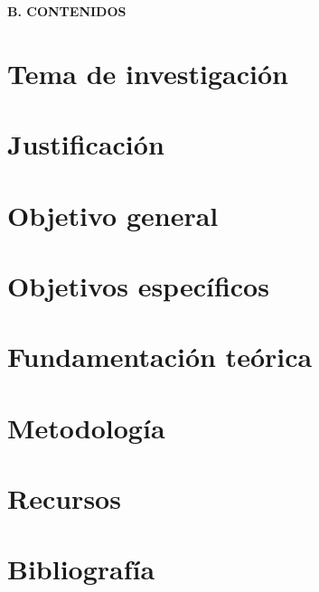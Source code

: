 \documentclass{perfil}
\begin{document}


\renewcommand{\thepage}{\arabic{page}}%
\begin{center} \textbf{B. CONTENIDOS} \end{center}

\section{Tema de investigación}


% 

\section{Justificación}


\section{Objetivo general}


\section{Objetivos específicos}


\section{Fundamentación teórica}




\section{Metodología}







% 
% 

\section{Recursos}




\newpage
{}
\section{Bibliografía}

\end{document}
